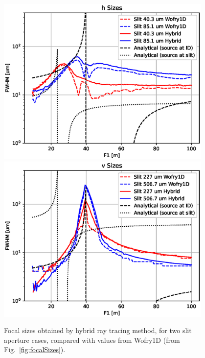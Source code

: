 \documentclass{iucr}              %
\begin{document}
\begin{figure}
    \centering

    \includegraphics[width=0.95\textwidth]{figures/sizes_h_hybrid.eps}
    \includegraphics[width=0.95\textwidth]{figures/sizes_v_hybrid.eps}
        
    \caption{Focal sizes obtained by hybrid ray tracing method, for two slit aperture cases, compared with values from Wofry1D  (from Fig.~\ref{fig:focalSizes}).}
    \label{fig:focalSizes_hybrid}
\end{figure}

\end{document}
